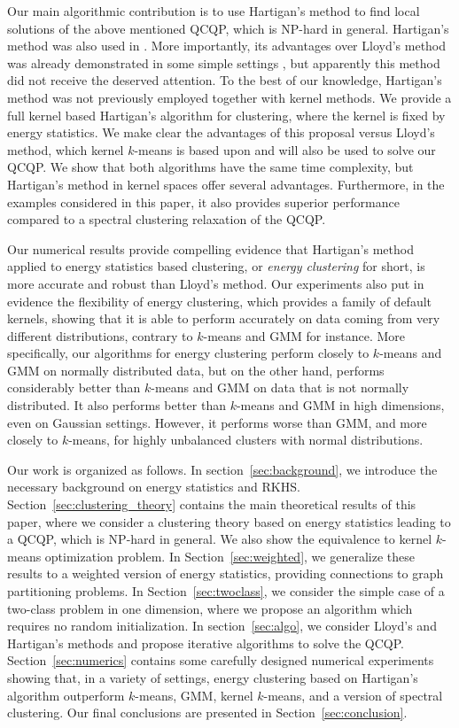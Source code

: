 \documentclass[aps,preprint,nofootinbib,floatfix]{revtex4-1}
\begin{document}
Our main 
algorithmic contribution is to use Hartigan's method \cite{Hartigan} to 
find local solutions of the above mentioned QCQP, which is NP-hard in general.
Hartigan's method was also used in \cite{Kgroups}. More importantly, its 
advantages
over Lloyd's method was already demonstrated 
in some simple settings
\cite{Telgarsky,Slonin}, but apparently this method did not receive 
the deserved attention. To the 
best of our knowledge, Hartigan's method was not previously 
employed together with kernel methods. 
We provide a full kernel based Hartigan's algorithm for clustering,
where the kernel is fixed by energy statistics. 
We make clear the advantages of this proposal versus 
Lloyd's method, which kernel $k$-means is based upon and will also be used 
to solve our QCQP. We show that both algorithms  have the same
time complexity, but Hartigan's method in kernel spaces offer several
advantages. Furthermore, in the examples considered in this paper, it 
also provides superior performance compared to a spectral clustering
relaxation of the QCQP.

Our numerical results provide compelling evidence that 
Hartigan's method applied to energy statistics based clustering, 
or \emph{energy clustering} for short, is more accurate and robust than 
Lloyd's method. Our experiments also put in evidence the
flexibility of energy clustering, which provides a family of default kernels, 
showing that it is able to perform accurately on data coming from 
very different distributions, contrary to $k$-means and GMM for instance.
More specifically, our algorithms for energy clustering perform 
closely to $k$-means and GMM on normally distributed data, but on the other
hand, performs considerably better than $k$-means and GMM on  data that 
is not normally distributed. It also performs better than $k$-means 
and GMM in high dimensions, even on Gaussian settings. However, it performs 
worse than GMM, and more closely to $k$-means, for highly unbalanced clusters
with normal distributions.

Our work is organized as follows. In section~\ref{sec:background}, we introduce
the necessary background on energy statistics and RKHS.
Section~\ref{sec:clustering_theory} contains the main theoretical 
results of this paper,
where we consider a clustering theory based on energy statistics leading
to a QCQP, which is NP-hard in general. We also show the equivalence to 
kernel $k$-means optimization problem.
In Section~\ref{sec:weighted}, we generalize these results to a weighted
version of energy statistics, providing connections to graph
partitioning problems.
In Section~\ref{sec:twoclass}, we consider the  simple case of a two-class
problem in one dimension,
where we propose an algorithm which requires no random initialization.
In section~\ref{sec:algo}, we consider Lloyd's and Hartigan's methods
and propose iterative algorithms to solve the QCQP.
Section~\ref{sec:numerics} contains some carefully designed numerical
experiments showing that, in a variety of settings, energy clustering based
on Hartigan's algorithm
outperform $k$-means, GMM, kernel $k$-means, and a version of
spectral clustering.
Our final conclusions are presented in Section~\ref{sec:conclusion}.
\end{document}
